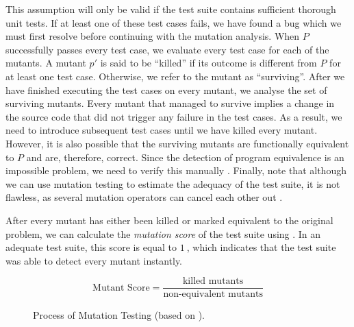 This assumption will only be valid if the test suite contains sufficient thorough unit tests. If at least one of these test cases fails, we have found a bug which we must first resolve before continuing with the mutation analysis. When $P$ successfully passes every test case, we evaluate every test case for each of the mutants. A mutant $p'$ is said to be ``killed'' if its outcome is different from $P$ for at least one test case. Otherwise, we refer to the mutant as ``surviving''. After we have finished executing the test cases on every mutant, we analyse the set of surviving mutants. Every mutant that managed to survive implies a change in the source code that did not trigger any failure in the test cases. As a result, we need to introduce subsequent test cases until we have killed every mutant. However, it is also possible that the surviving mutants are functionally equivalent to $P$ and are, therefore, correct. Since the detection of program equivalence is an impossible problem, we need to verify this manually \cite{5487526, Offutt2001}. Finally, note that although we can use mutation testing to estimate the adequacy of the test suite, it is not flawless, as several mutation operators can cancel each other out \cite{evaluationoftestsuiteminimization}.

\clearpage

\noindent After every mutant has either been killed or marked equivalent to the original problem, we can calculate the \emph{mutation score} of the test suite using . In an adequate test suite, this score is equal to $\SI{1}{}$, which indicates that the test suite was able to detect every mutant instantly.

\begin{equation}\label{eq:mutant-score}
	\text{Mutant Score} = \frac{\text{killed mutants}}{\text{non-equivalent mutants}}
\end{equation}

\begin{figure}[h!]
	\centering
	
	\caption{Process of Mutation Testing (based on \cite{Offutt2001}).}
	\label{fig:mutation-testing}
\end{figure}